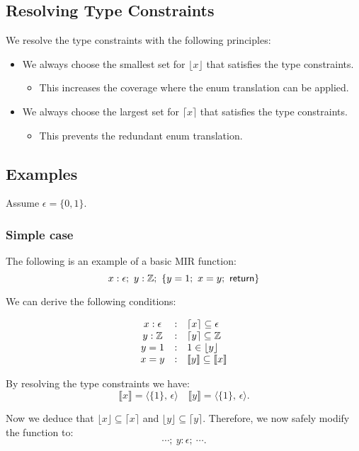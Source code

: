 \documentclass[peerreview, 10pt]{IEEEtran}
\newcommand{\Z}{\ensuremath{\mathbb{Z}}}
\newcommand{\cons}[1]{\ensuremath{\llbracket#1\rrbracket}}
\newcommand{\consp}[2]{\ensuremath{\langle#1,\,#2\rangle}}
\newcommand{\floor}[1]{\ensuremath{\lfloor#1\rfloor}}
\newcommand{\ceil}[1]{\ensuremath{\lceil#1\rceil}}
\newcommand{\enum}{\ensuremath{\epsilon}}
\newcommand{\ifrule}[2]{\ensuremath{#1&:&#2}}
\begin{document}
\subsection{Resolving Type Constraints}

We resolve the type constraints with the following principles:

\begin{itemize}
  \item We always choose the smallest set for $\floor{x}$ that satisfies the type constraints.
  \begin{itemize}
    \item This increases the coverage where the enum translation can be applied.
  \end{itemize}
  \item We always choose the largest set for $\ceil{x}$ that satisfies the type constraints.
  \begin{itemize}
    \item This prevents the redundant enum translation.
  \end{itemize}
\end{itemize}

\subsection{Examples}
Assume $\enum = \{0,1\}$.
\subsubsection{Simple case}
The following is an example of a basic MIR function:
\[
  x:\enum;\ y:\Z;\ \{y=1;\ x=y;\ \sf return\}
\]

We can derive the following conditions:

\[
\begin{array}{@{}ccl@{}}
  \ifrule{x:\enum}{\ceil{x}\subseteq\enum}\\
  \ifrule{y:\Z}{\ceil{y}\subseteq\Z}\\
  \ifrule{y=1}{1\in\floor{y}}\\
  \ifrule{x=y}{\cons{y}\subseteq\cons{x}}
\end{array}
\]

By resolving the type constraints we have:
\[
\cons{x}=\consp{\{1\}}{\enum}\quad\cons{y}=\consp{\{1\}}{\enum}.
\]

Now we deduce that $\floor{x}\subseteq\ceil{x}$ and $\floor{y}\subseteq\ceil{y}$. Therefore, we now safely modify the function to:
\[
\cdots;\ y:\enum;\ \cdots.
\]
\end{document}
